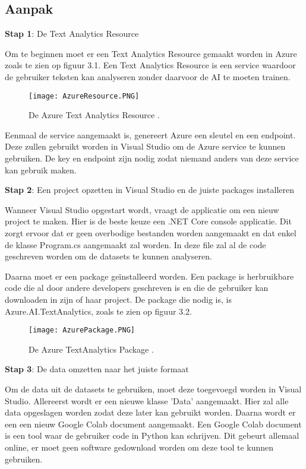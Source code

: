 \subsection{Aanpak}
\label{aanpakazure}
\textbf{Stap 1}: De Text Analytics Resource

Om te beginnen moet er een Text Analytics Resource gemaakt worden in Azure zoals te zien op figuur 3.1. Een Text Analytics Resource is een service waardoor de gebruiker teksten kan analyseren zonder daarvoor de AI te moeten trainen. \autocite{Microsoft2020}

\begin{figure}[!htbp]
    \texttt{[image: AzureResource.PNG]}
    \caption{\label{azureresource}De Azure Text Analytics Resource \autocite{Microsoft2021}.}
\end{figure}
\FloatBarrier

Eenmaal de service aangemaakt is, genereert Azure een sleutel en een endpoint. Deze zullen gebruikt worden in Visual Studio om de Azure service te kunnen gebruiken. De key en endpoint zijn nodig zodat niemand anders van deze service kan gebruik maken. 

\textbf{Stap 2}: Een project opzetten in Visual Studio en de juiste packages installeren

Wanneer Visual Studio opgestart wordt, vraagt de applicatie om een nieuw project te maken. Hier is de beste keuze een .NET Core console applicatie. Dit zorgt ervoor dat er geen overbodige bestanden worden aangemaakt en dat enkel de klasse Program.cs aangemaakt zal worden. In deze file zal al de code geschreven worden om de datasets te kunnen analyseren. \autocite{Microsoft2020}

Daarna moet er een package geïnstalleerd worden. Een package is herbruikbare code die al door andere developers geschreven is en die de gebruiker kan downloaden in zijn of haar project. \autocite{Microsoft2018} De package die nodig is, is Azure.AI.TextAnalytics, zoals te zien op figuur 3.2.

\begin{figure}[!htbp]
    \texttt{[image: AzurePackage.PNG]}
    \caption{\label{azurepackage}De Azure TextAnalytics Package \autocite{Microsoft2020}.}
\end{figure}
\FloatBarrier


\textbf{Stap 3}: De data omzetten naar het juiste formaat

Om de data uit de datasets te gebruiken, moet deze toegevoegd worden in Visual Studio. Allereerst wordt er een nieuwe klasse 'Data' aangemaakt. Hier zal alle data opgeslagen worden zodat deze later kan gebruikt worden. Daarna wordt er een een nieuw Google Colab document aangemaakt. Een Google Colab document is een tool waar de gebruiker code in Python kan schrijven. Dit gebeurt allemaal online, er moet geen software gedownload worden om deze tool te kunnen gebruiken. 


